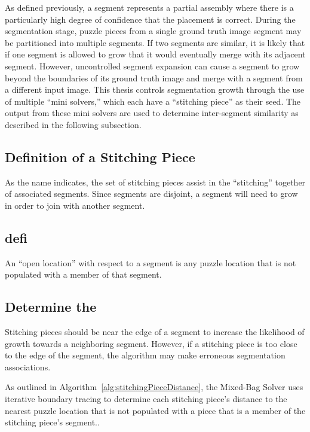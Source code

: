 As defined previously, a segment represents a partial assembly where there is a particularly high degree of confidence that the placement is correct. During the segmentation stage, puzzle pieces from a single ground truth image segment may be partitioned into multiple segments. If two segments are similar, it is likely that if one segment is allowed to grow that it would eventually merge with its adjacent segment.  However, uncontrolled segment expansion can cause a segment to grow beyond the boundaries of its ground truth image and merge with a segment from a different input image.  This thesis controls segmentation growth through the use of multiple ``mini solvers,'' which each have a ``stitching piece'' as their seed.  The output from these mini solvers are used to determine inter-segment similarity as described in the following subsection.

\subsection{Definition of a Stitching Piece}

As the name indicates, the set of stitching pieces assist in the ``stitching'' together of associated segments.  Since segments are disjoint, a segment will need to grow in order to join with another segment.  

\subsection{defi}



An ``open location'' with respect to a segment is any puzzle location that is not populated with a member of that segment.  

\subsection{Determine the }

Stitching pieces should be near the edge of a segment to increase the likelihood of growth towards a neighboring segment.  However,  if a stitching piece is too close to the edge of the segment, the algorithm may make erroneous segmentation associations.   

As outlined in Algorithm~\ref{alg:stitchingPieceDistance}, the Mixed-Bag Solver uses iterative boundary tracing to determine each stitching piece's distance to the nearest puzzle location that is not populated with a piece that is a member of the stitching piece's segment..

